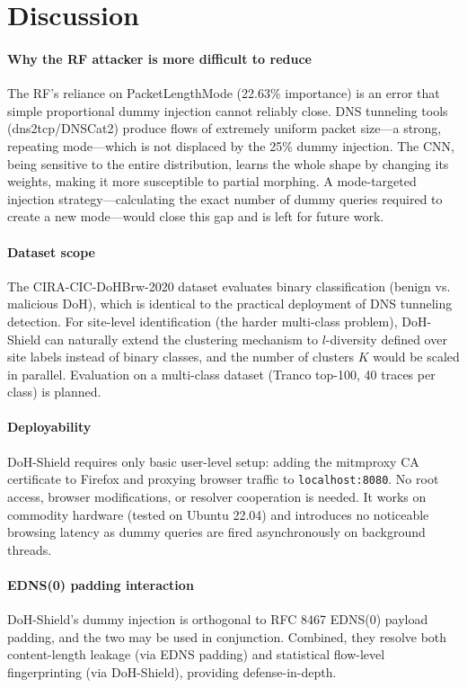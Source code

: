 \documentclass[conference]{IEEEtran}
\begin{document}
\section{Discussion}\label{sec:discussion}

\paragraph{Why the RF attacker is more difficult to reduce} The RF's reliance on PacketLengthMode (22.63\% importance) is an error that simple proportional dummy injection cannot reliably close. DNS tunneling tools (dns2tcp/DNSCat2) produce flows of extremely uniform packet size---a strong, repeating mode---which is not displaced by the 25\% dummy injection. The CNN, being sensitive to the entire distribution, learns the whole shape by changing its weights, making it more susceptible to partial morphing. A mode-targeted injection strategy---calculating the exact number of dummy queries required to create a new mode---would close this gap and is left for future work.

\paragraph{Dataset scope} The CIRA-CIC-DoHBrw-2020 dataset evaluates binary classification (benign vs. malicious DoH), which is identical to the practical deployment of DNS tunneling detection. For site-level identification (the harder multi-class problem), DoH-Shield can naturally extend the clustering mechanism to $l$-diversity defined over site labels instead of binary classes, and the number of clusters $K$ would be scaled in parallel. Evaluation on a multi-class dataset (Tranco top-100, 40 traces per class) is planned.

\paragraph{Deployability} DoH-Shield requires only basic user-level setup: adding the mitmproxy CA certificate to Firefox and proxying browser traffic to \texttt{localhost:8080}. No root access, browser modifications, or resolver cooperation is needed. It works on commodity hardware (tested on Ubuntu 22.04) and introduces no noticeable browsing latency as dummy queries are fired asynchronously on background threads.

\paragraph{EDNS(0) padding interaction} DoH-Shield's dummy injection is orthogonal to RFC 8467 EDNS(0) payload padding, and the two may be used in conjunction. Combined, they resolve both content-length leakage (via EDNS padding) and statistical flow-level fingerprinting (via DoH-Shield), providing defense-in-depth.
\end{document}
